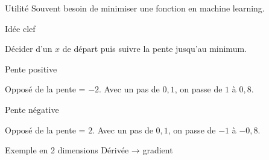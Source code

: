 \begin{frame}{Utilité}
  Souvent besoin de minimiser une fonction en machine learning.
\end{frame}

\begin{frame}{Idée clef}

  Décider d'un $x$ de départ puis suivre la pente jusqu'au minimum.


\end{frame}

\begin{frame}{Pente positive}


  Opposé de la pente = $-2$. Avec un pas de $0,1$, on passe de $1$ à $0,8$.
\end{frame}

\begin{frame}{Pente négative}


  Opposé de la pente = $2$. Avec un pas de $0,1$, on passe de $-1$ à $-0,8$.
\end{frame}

\begin{frame}{Exemple en 2 dimensions}
  Dérivée → gradient
\end{frame}
